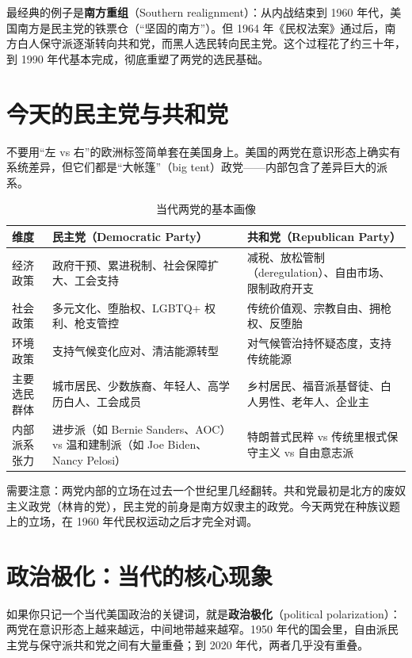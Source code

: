 \documentclass[12pt,a4paper]{ctexart}
\begin{document}
最经典的例子是\textbf{南方重组}（Southern realignment）：从内战结束到 1960 年代，美国南方是民主党的铁票仓（``坚固的南方''）。但 1964 年《民权法案》通过后，南方白人保守派逐渐转向共和党，而黑人选民转向民主党。这个过程花了约三十年，到 1990 年代基本完成，彻底重塑了两党的选民基础。

\section{今天的民主党与共和党}

不要用``左 vs 右''的欧洲标签简单套在美国身上。美国的两党在意识形态上确实有系统差异，但它们都是``大帐篷''（big tent）政党——内部包含了差异巨大的派系。

\begin{table}[h]
\centering
\caption{当代两党的基本画像}
\begin{tabular}{@{}lp{6.2cm}p{6.2cm}@{}}
\toprule
\textbf{维度} & \textbf{民主党（Democratic Party）} & \textbf{共和党（Republican Party）} \\
\midrule
经济政策 & 政府干预、累进税制、社会保障扩大、工会支持 & 减税、放松管制（deregulation）、自由市场、限制政府开支 \\
社会政策 & 多元文化、堕胎权、LGBTQ+ 权利、枪支管控 & 传统价值观、宗教自由、拥枪权、反堕胎 \\
环境政策 & 支持气候变化应对、清洁能源转型 & 对气候管治持怀疑态度，支持传统能源 \\
主要选民群体 & 城市居民、少数族裔、年轻人、高学历白人、工会成员 & 乡村居民、福音派基督徒、白人男性、老年人、企业主 \\
内部派系张力 & 进步派（如 Bernie Sanders、AOC）vs 温和建制派（如 Joe Biden、Nancy Pelosi） & 特朗普式民粹 vs 传统里根式保守主义 vs 自由意志派 \\
\bottomrule
\end{tabular}
\end{table}

需要注意：两党内部的立场在过去一个世纪里几经翻转。共和党最初是北方的废奴主义政党（林肯的党），民主党的前身是南方奴隶主的政党。今天两党在种族议题上的立场，在 1960 年代民权运动之后才完全对调。

\section{政治极化：当代的核心现象}

如果你只记一个当代美国政治的关键词，就是\textbf{政治极化}（political polarization）：两党在意识形态上越来越远，中间地带越来越窄。1950 年代的国会里，自由派民主党与保守派共和党之间有大量重叠；到 2020 年代，两者几乎没有重叠。
\end{document}
